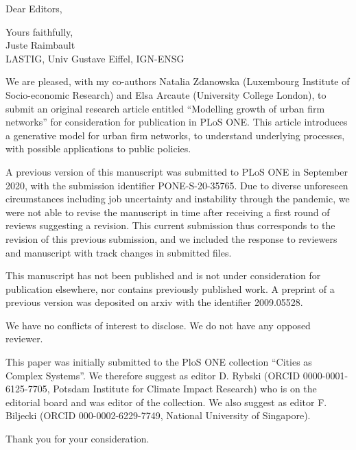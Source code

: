 \documentclass[11pt,a4paper,sans]{moderncv}
\begin{document}
\date{May 23th 2022}
\opening{Dear Editors,}
\closing{Yours faithfully,\\
Juste Raimbault\\
LASTIG, Univ Gustave Eiffel, IGN-ENSG
}
   
\makelettertitle

\justify
We are pleased, with my co-authors Natalia Zdanowska (Luxembourg Institute of Socio-economic Research) and Elsa Arcaute (University College London), to submit an original research article entitled ``Modelling growth of urban firm networks'' for consideration for publication in PLoS ONE. This article introduces a generative model for urban firm networks, to understand underlying processes, with possible applications to public policies.

A previous version of this manuscript was submitted to PLoS ONE in September 2020, with the submission identifier PONE-S-20-35765. Due to diverse unforeseen circumstances including job uncertainty and instability through the pandemic, we were not able to revise the manuscript in time after receiving a first round of reviews suggesting a revision. This current submission thus corresponds to the revision of this previous submission, and we included the response to reviewers and manuscript with track changes in submitted files.

This manuscript has not been published and is not under consideration for publication elsewhere, nor contains previously published work. A preprint of a previous version was deposited on arxiv with the identifier 2009.05528.

We have no conflicts of interest to disclose. We do not have any opposed reviewer.

This paper was initially submitted to the PloS ONE collection ``Cities as Complex Systems''. We therefore suggest as editor D. Rybski (ORCID 0000-0001-6125-7705, Potsdam Institute for Climate Impact Research) who is on the editorial board and was editor of the collection. We also suggest as editor F. Biljecki (ORCID 000-0002-6229-7749, National University of Singapore).


Thank you for your consideration.
\justify




\makeletterclosing
\end{document}
